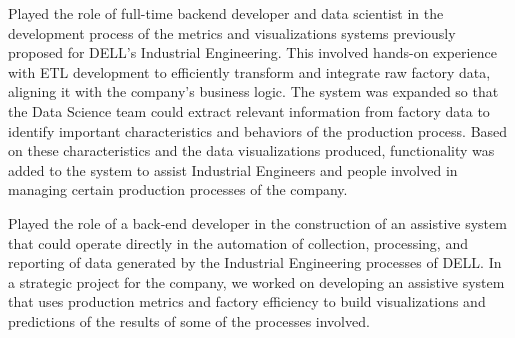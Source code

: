 \documentclass[]{rahulworld-resume}
\begin{document}
\begin{minipage}[t]{0.66\textwidth}
 
\noindent
\hspace{5em}%
\begin{minipage}{0.85\textwidth\vspace{2pt}}
Played the role of full-time backend developer and data scientist in the development process of the metrics and visualizations systems previously proposed for DELL’s Industrial Engineering. This involved hands-on experience with ETL development to efficiently transform and integrate raw factory data, aligning it with the company's business logic. The system was expanded so that the Data Science team could extract relevant information from factory data to identify important characteristics and behaviors of the production process. Based on these characteristics and the data visualizations produced, functionality was added to the system to assist Industrial Engineers and people involved in managing certain production processes of the company.

\end{minipage}
\sectionsep


 
\noindent
\hspace{5em}%
\begin{minipage}{0.85\textwidth\vspace{2pt}}
Played the role of a back-end developer in the construction of an assistive system that could operate directly in the automation of collection, processing, and reporting of data generated by the Industrial Engineering processes of DELL. In a strategic project for the company, we worked on developing an assistive system that uses production metrics and factory efficiency to build visualizations and predictions of the results of some of the processes involved.


\end{minipage}
\end{minipage}
\end{document}
